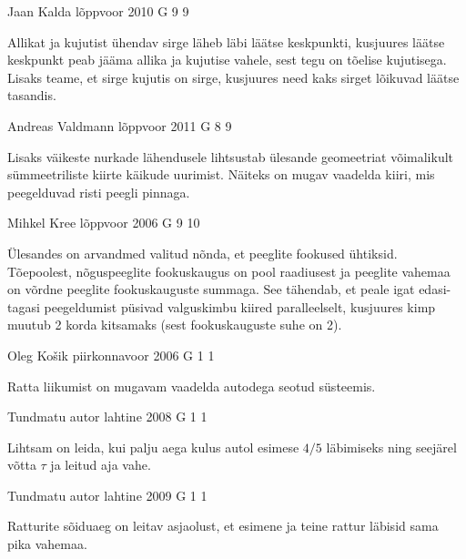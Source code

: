\documentclass[11pt, twoside]{article}
\begin{document}
{%
{Jaan Kalda} %
{lõppvoor} %
{2010} %
{G 9} %
{9} %
{

\ifHint
Allikat ja kujutist ühendav sirge läheb läbi läätse keskpunkti, kusjuures läätse keskpunkt peab jääma allika ja kujutise vahele, sest tegu on tõelise kujutisega. Lisaks teame, et sirge kujutis on sirge, kusjuures need kaks sirget lõikuvad läätse tasandis.
\fi
}

{Andreas Valdmann} %
{lõppvoor} %
{2011} %
{G 8} %
{9} %
{

\ifHint
Lisaks väikeste nurkade lähendusele lihtsustab ülesande geomeetriat võimalikult sümmeetriliste kiirte käikude uurimist. Näiteks on mugav vaadelda kiiri, mis peegelduvad risti peegli pinnaga.
\fi
}

{Mihkel Kree} %
{lõppvoor} %
{2006} %
{G 9} %
{10} %
{

\ifHint
Ülesandes on arvandmed valitud nõnda, et peeglite fookused ühtiksid. Tõepoolest, nõguspeeglite fookuskaugus on pool raadiusest ja peeglite vahemaa on võrdne peeglite fookuskauguste summaga. See tähendab, et peale igat edasi-tagasi peegeldumist püsivad valguskimbu kiired paralleelselt, kusjuures kimp muutub 2 korda kitsamaks (sest fookuskauguste suhe on 2).
\fi
}

{Oleg Košik} %
{piirkonnavoor} %
{2006} %
{G 1} %
{1} %
{

\ifHint
Ratta liikumist on mugavam vaadelda autodega seotud süsteemis.
\fi
}

{Tundmatu autor} %
{lahtine} %
{2008} %
{G 1} %
{1} %
{

\ifHint
Lihtsam on leida, kui palju aega kulus autol esimese $4/5$ läbimiseks ning seejärel võtta $\tau$ ja leitud aja vahe.
\fi
}

{Tundmatu autor} %
{lahtine} %
{2009} %
{G 1} %
{1} %
{

\ifHint
Ratturite sõiduaeg on leitav asjaolust, et esimene ja teine rattur läbisid sama pika vahemaa.
\fi
}

}
\end{document}
